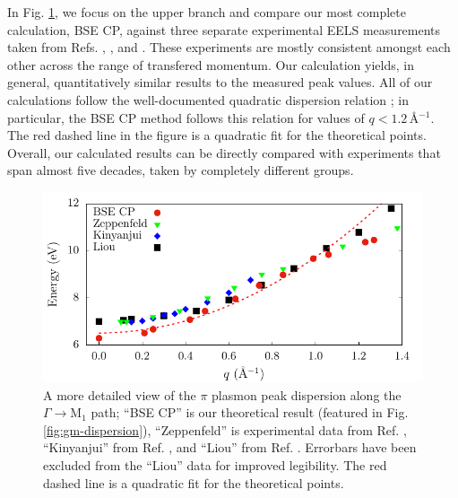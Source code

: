 \documentclass[aps,prb,10pt,showpacs,superscriptaddress,twocolumn,notitlepage]{revtex4-1}
\begin{document}
In Fig. \ref{fig:gm-dispersion2}, we focus on the upper branch and compare our
most complete calculation, BSE CP, against three separate experimental EELS
measurements taken from Refs. ,
, and . These experiments are
mostly consistent amongst each other across the range of transfered momentum. Our
calculation yields, in general, quantitatively similar results to the measured
peak values.
All of our calculations follow the well-documented quadratic dispersion relation 
\cite{zeppenfeldZP71, marinopoulosPRB04}; in particular, the BSE CP method
follows this relation for values of $q < 1.2$\,\r{A}$^{-1}$. The red dashed line
in the figure is a quadratic fit for the theoretical points.
Overall, our calculated results can be directly compared with
experiments that span almost five decades, taken by completely different groups.

\begin{figure}[b]
\includegraphics[width=\linewidth]{fig05}
\caption{A more detailed view of the $\pi$ plasmon peak dispersion along the
$\Gamma \rightarrow \mathrm{M}_{1}$ path; ``BSE CP'' is our theoretical result
(featured in Fig. \ref{fig:gm-dispersion}), ``Zeppenfeld'' is experimental data
from Ref. , ``Kinyanjui'' from Ref.
, and ``Liou'' from Ref. .
Errorbars have been excluded from the ``Liou'' data for improved legibility.
The red dashed line is a quadratic fit for the theoretical points.}
\label{fig:gm-dispersion2}
\end{figure}
\end{document}
